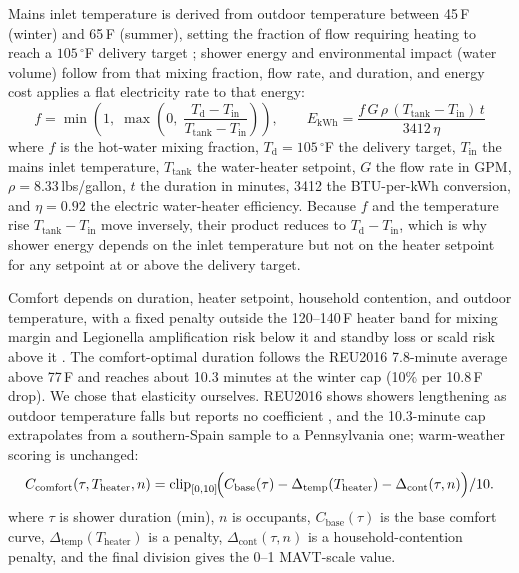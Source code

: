 \documentclass[final,3p,times]{elsarticle}
\begin{document}
Mains inlet temperature is derived from outdoor temperature between 45\,\textdegree{}F (winter) and 65\,\textdegree{}F (summer), setting the fraction of flow requiring heating to reach a $105\,^\circ$F delivery target \cite{zhang2023}; shower energy and environmental impact (water volume) follow from that mixing fraction, flow rate, and duration, and energy cost applies a flat electricity rate to that energy:
\begin{equation}
  f = \min\!\left(1,\;\max\!\left(0,\;\frac{T_{\mathrm{d}} - T_{\mathrm{in}}}{T_{\mathrm{tank}} - T_{\mathrm{in}}}\right)\right),
  \qquad
  E_{\mathrm{kWh}} = \frac{f\,G\,\rho\,(T_{\mathrm{tank}} - T_{\mathrm{in}})\,t}{3412\,\eta}
  \label{eq:shower_energy}
\end{equation}
\noindent where $f$ is the hot-water mixing fraction, $T_{\mathrm{d}} = 105\,^\circ$F the delivery target, $T_{\mathrm{in}}$ the mains inlet temperature, $T_{\mathrm{tank}}$ the water-heater setpoint, $G$ the flow rate in GPM, $\rho = 8.33$\,lbs/gallon, $t$ the duration in minutes, 3412 the BTU-per-kWh conversion, and $\eta = 0.92$ the electric water-heater efficiency. Because $f$ and the temperature rise $T_{\mathrm{tank}} - T_{\mathrm{in}}$ move inversely, their product reduces to $T_{\mathrm{d}} - T_{\mathrm{in}}$, which is why shower energy depends on the inlet temperature but not on the heater setpoint for any setpoint at or above the delivery target.

Comfort depends on duration, heater setpoint, household contention, and outdoor temperature, with a fixed penalty outside the 120--140\,\textdegree{}F heater band for mixing margin and Legionella amplification risk below it and standby loss or scald risk above it \cite{cdc2026}. The comfort-optimal duration follows the REU2016 7.8-minute average above 77\,\textdegree{}F and reaches about 10.3 minutes at the winter cap (10\% per 10.8\,\textdegree{}F drop). We chose that elasticity ourselves. REU2016 shows showers lengthening as outdoor temperature falls but reports no coefficient \cite{reu2016}, and the 10.3-minute cap extrapolates from a southern-Spain sample to a Pennsylvania one; warm-weather scoring is unchanged:
\begin{equation}
  C_{\mathrm{comfort}}(\tau,T_{\mathrm{heater}},n)
  = \mathrm{clip}_{[0,10]}\!\Bigl(C_{\mathrm{base}}(\tau)
  -\Delta_{\mathrm{temp}}(T_{\mathrm{heater}})
  -\Delta_{\mathrm{cont}}(\tau,n)\Bigr)/10.
  \label{eq:shower_comfort_full}
\end{equation}
\noindent where $\tau$ is shower duration (min), $n$ is occupants, $C_{\mathrm{base}}(\tau)$ is the base comfort curve, $\Delta_{\mathrm{temp}}(T_{\mathrm{heater}})$ is a penalty, $\Delta_{\mathrm{cont}}(\tau,n)$ is a household-contention penalty, and the final division gives the 0--1 MAVT-scale value.
\end{document}
